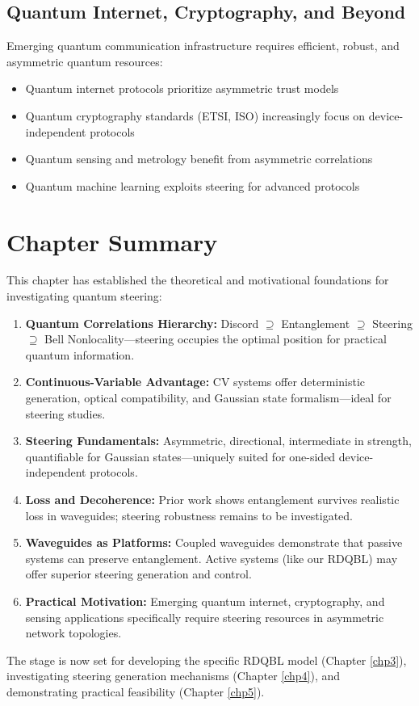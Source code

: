 \subsection{Quantum Internet, Cryptography, and Beyond}

Emerging quantum communication infrastructure requires efficient, robust, and asymmetric quantum resources:

\begin{itemize}
	\item Quantum internet protocols prioritize asymmetric trust models
	\item Quantum cryptography standards (ETSI, ISO) increasingly focus on device-independent protocols
	\item Quantum sensing and metrology benefit from asymmetric correlations
	\item Quantum machine learning exploits steering for advanced protocols
\end{itemize}

\section{Chapter Summary}

This chapter has established the theoretical and motivational foundations for investigating quantum steering:

\begin{enumerate}
	\item \textbf{Quantum Correlations Hierarchy:} Discord $\supseteq$ Entanglement $\supseteq$ Steering $\supseteq$ Bell Nonlocality—steering occupies the optimal position for practical quantum information.

	\item \textbf{Continuous-Variable Advantage:} CV systems offer deterministic generation, optical compatibility, and Gaussian state formalism—ideal for steering studies.

	\item \textbf{Steering Fundamentals:} Asymmetric, directional, intermediate in strength, quantifiable for Gaussian states—uniquely suited for one-sided device-independent protocols.

	\item \textbf{Loss and Decoherence:} Prior work shows entanglement survives realistic loss in waveguides; steering robustness remains to be investigated.

	\item \textbf{Waveguides as Platforms:} Coupled waveguides demonstrate that passive systems can preserve entanglement. Active systems (like our RDQBL) may offer superior steering generation and control.

	\item \textbf{Practical Motivation:} Emerging quantum internet, cryptography, and sensing applications specifically require steering resources in asymmetric network topologies.
\end{enumerate}

The stage is now set for developing the specific RDQBL model (Chapter \ref{chp3}), investigating steering generation mechanisms (Chapter \ref{chp4}), and demonstrating practical feasibility (Chapter \ref{chp5}).

